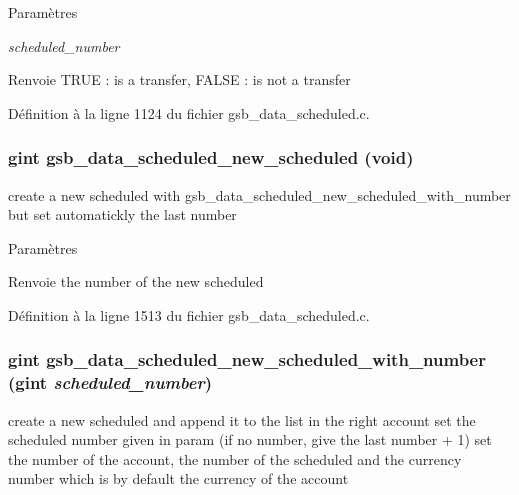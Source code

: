 \begin{DoxyParams}{Paramètres}
\item[{\em scheduled\_\-number}]\end{DoxyParams}
\begin{DoxyReturn}{Renvoie}
TRUE : is a transfer, FALSE : is not a transfer 
\end{DoxyReturn}


Définition à la ligne 1124 du fichier gsb\_\-data\_\-scheduled.c.

\subsubsection[{gsb\_\-data\_\-scheduled\_\-new\_\-scheduled}]{\setlength{\rightskip}{0pt plus 5cm}gint gsb\_\-data\_\-scheduled\_\-new\_\-scheduled (void)}\label{gsb__data__scheduled_8c_a2ee4e80b44acc9dfebb787bb5e99b79f}
create a new scheduled with gsb\_\-data\_\-scheduled\_\-new\_\-scheduled\_\-with\_\-number but set automatickly the last number


\begin{DoxyParams}{Paramètres}
\item[{\em }]\end{DoxyParams}
\begin{DoxyReturn}{Renvoie}
the number of the new scheduled 
\end{DoxyReturn}


Définition à la ligne 1513 du fichier gsb\_\-data\_\-scheduled.c.

\subsubsection[{gsb\_\-data\_\-scheduled\_\-new\_\-scheduled\_\-with\_\-number}]{\setlength{\rightskip}{0pt plus 5cm}gint gsb\_\-data\_\-scheduled\_\-new\_\-scheduled\_\-with\_\-number (gint {\em scheduled\_\-number})}\label{gsb__data__scheduled_8c_af1bd07298abcb5c324662e26fd250728}
create a new scheduled and append it to the list in the right account set the scheduled number given in param (if no number, give the last number + 1) set the number of the account, the number of the scheduled and the currency number which is by default the currency of the account



